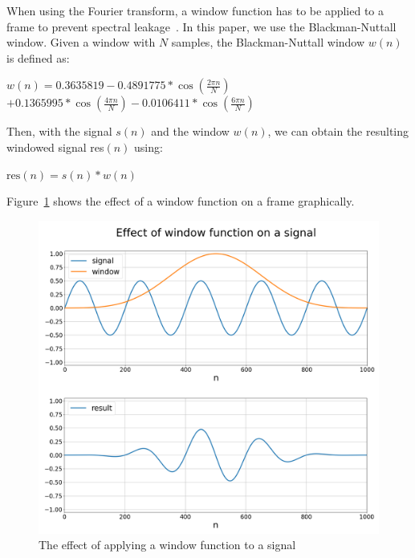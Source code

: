 \documentclass[10pt,twocolumn]{article}
\begin{document}
When using the Fourier transform, a window function has to be applied to a frame to prevent spectral leakage~\cite{window}. In this paper, we use the Blackman-Nuttall window. Given a window with $N$ samples, the Blackman-Nuttall window $w(n)$ is defined as:\vspace{-1mm}
\begin{center}
    \hspace{-12mm} $w(n) = 0.3635819 - 0.4891775*\cos(\frac{2\pi n}{N})$ \\\vspace{+0.5mm}
    \hspace{+4mm} $+ 0.1365995 * \cos(\frac{4\pi n}{N}) - 0.0106411 * \cos(\frac{6\pi n}{N})$
\end{center}%
Then, with the signal $s(n)$ and the window $w(n)$, we can obtain the resulting windowed signal res$(n)$ using:
\begin{center}%
    $\text{res}(n) = s(n) * w(n)$
\end{center}
Figure~\ref{fig:spec} shows the effect of a window function on a frame graphically.
\begin{figure}[H]%
    \centering
    \includegraphics[width=\linewidth]{3.png} %
    \caption{The effect of applying a window function to a signal}
    \label{fig:spec}
\end{figure}%
\end{document}
